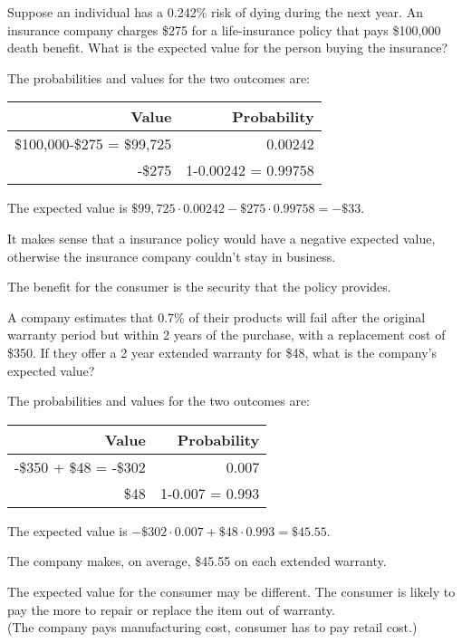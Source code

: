 \documentclass{beamer}
\begin{document}
\begin{frame}
\begin{example}
Suppose an individual has a 0.242\% risk of dying during the next year. An insurance company charges \$275 for a life-insurance policy that pays \$100,000 death benefit. What is the expected value for the person buying the insurance?\pause

\vspace{2mm}
The probabilities and values for the two outcomes are:
\begin{center}
\begin{tabular}{|r|r|} \hline
Value & Probability \\ \hline
\$100,000-\$275 = \$99,725 & 0.00242 \\ \hline
-\$275 & 1-0.00242 = 0.99758 \\ \hline
\end{tabular}
\end{center}\pause
The expected value is $\$99,725\cdot 0.00242 -\$275\cdot0.99758 = -\$33$.
\end{example}\pause
\begin{note}
It makes sense that a insurance policy would have a negative expected value, otherwise the insurance company couldn't stay in business.

\vspace{2mm}
The benefit for the consumer is the security that the policy provides.
\end{note}
\end{frame}

\begin{frame}
\begin{example}
A company estimates that 0.7\% of their products will fail after the original warranty period but within 2 years of the purchase, with a replacement cost of \$350. If they offer a 2 year extended warranty for \$48, what is the company's expected value?\pause

\vspace{2mm}
The probabilities and values for the two outcomes are:
\begin{center}
\begin{tabular}{|r|r|} \hline
Value & Probability \\ \hline
-\$350 + \$48 = -\$302 & 0.007 \\ \hline
\$48 & 1-0.007 = 0.993 \\ \hline
\end{tabular}
\end{center}\pause
The expected value is $-\$302\cdot 0.007 + \$48\cdot0.993 = \$45.55$.

\vspace{2mm}
The company makes, on average, \$45.55 on each extended warranty.
\end{example}\pause

\begin{note}
The expected value for the consumer may be different. The consumer is likely to pay the more to repair or replace the item out of warranty.\\ (The company pays manufacturing cost, consumer has to pay retail cost.)
\end{note}
\end{frame}
\end{document}
